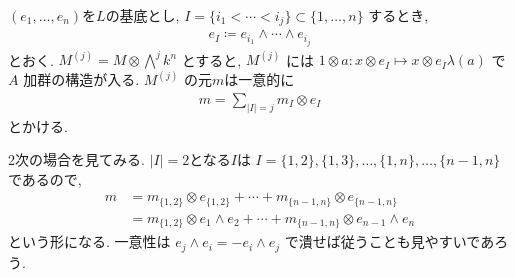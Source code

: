 \documentclass[11pt, a4paper, dvipdfmx]{jsarticle}
\theoremstyle{definition}
\numberwithin{equation}{section}
\begin{document}
$(e_1,\ldots, e_n)$を$L$の基底とし, 
$I=\{i_1<\cdots<i_j\}\subset \{1,\ldots,n\}$
するとき, 
\begin{align*}
    e_I \coloneqq e_{i_1}\wedge\cdots\wedge e_{i_j}
\end{align*}
とおく. 
$M^{(j)} = M \otimes \bigwedge^j k^n$ とすると, 
$M^{(j)}$ には 
$1\otimes a:x\otimes e_I \mapsto x\otimes e_I \lambda(a)$
で$A$ 加群の構造が入る. 
$M^{(j)}$ の元$m$は一意的に
\begin{align*}
    m = \sum_{|I|=j} m_I \otimes e_{I}
\end{align*}
とかける. 

2次の場合を見てみる. $|I| = 2$となる$I$は
$I = \{1,2\}, \{1,3\},\ldots,\{1,n\},\ldots,\{n-1,n\}$
であるので, 
\begin{align*}
    m &= m_{\{1,2\}}\otimes e_{\{1,2\}} 
    +\cdots
    + m_{\{n-1,n\}}\otimes e_{\{n-1,n\}}\\
    &=m_{\{1,2\}}\otimes e_1\wedge e_2 
    +\cdots
    + m_{\{n-1,n\}}\otimes e_{n-1}\wedge e_n
\end{align*}
という形になる. 一意性は 
$e_j\wedge e_i = -e_i\wedge e_j$
で潰せば従うことも見やすいであろう. 
\end{document}
